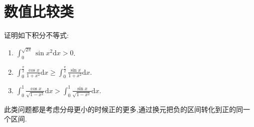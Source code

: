 \documentclass[../../main.tex]{subfiles}%
\begin{document}
\section{数值比较类}

\begin{example}
证明如下积分不等式:
\begin{enumerate}
\item $\int_{0}^{\sqrt{2\pi}} \sin x^{2}\mathrm{d}x > 0$.

\item $\int_{0}^{\frac{\pi}{2}} \frac{\cos x}{1 + x^{2}}\mathrm{d}x \geqslant \int_{0}^{\frac{\pi}{2}} \frac{\sin x}{1 + x^{2}}\mathrm{d}x.$

\item $\int_{0}^{1} \frac{\cos x}{\sqrt{1 - x^{2}}}\mathrm{d}x > \int_{0}^{1} \frac{\sin x}{\sqrt{1 - x^{2}}}\mathrm{d}x.$
\end{enumerate}
\end{example}
\begin{note}
此类问题都是考虑分母更小的时候正的更多,通过换元把负的区间转化到正的同一个区间.
\end{note}
\end{document}
